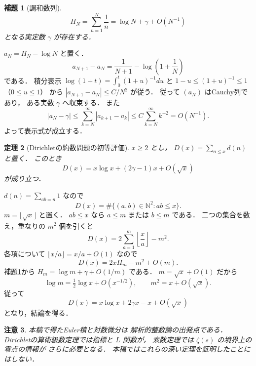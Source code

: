 \documentclass[a5paper,10pt,onecolumn]{jsarticle}
\makeatletter
\theoremstyle{mathnotetheorem}
\newtheorem{theorem}{定理}[section]
\newtheorem{lemma}[theorem]{補題}
\newtheorem{remark}[theorem]{注意}
\renewcommand{\proofname}{証明}
\renewenvironment{proof}[1][\proofname]{%
  \par\pushQED{\qed}\normalfont\topsep4\p@\@plus2\p@\relax
  \trivlist\item[\hskip\labelsep\bfseries #1]\ignorespaces
}{\popQED\endtrivlist\@endpefalse}
\makeatother
\begin{document}
\begin{lemma}[調和数列]\label{lem:harmonic}
\[
 H_N=\sum_{n=1}^N\frac1n
 =\log N+\gamma+O(N^{-1})
\]
となる実定数 $\gamma$ が存在する．
\end{lemma}
\begin{proof}
$a_N=H_N-\log N$ と置く．
\[
 a_{N+1}-a_N
 =\frac1{N+1}-\log\left(1+\frac1N\right)
\]
である．
積分表示
$\log(1+t)=\int_0^t(1+u)^{-1}du$ と
$1-u\le(1+u)^{-1}\le1$（$0\le u\le1$）
から $|a_{N+1}-a_N|\le C/N^2$ が従う．
従って $(a_N)$ はCauchy列であり，
ある実数 $\gamma$ へ収束する．
また
\[
 |a_N-\gamma|
 \le\sum_{k=N}^\infty|a_{k+1}-a_k|
 \le C\sum_{k=N}^\infty k^{-2}=O(N^{-1}).
\]
よって表示式が成立する．
\end{proof}

\begin{theorem}[Dirichletの約数問題の初等評価]
\label{thm:divisor-average}
$x\ge2$ とし，
$D(x)=\sum_{n\le x}d(n)$ と置く．
このとき
\[
 D(x)=x\log x+(2\gamma-1)x+O(\sqrt x)
\]
が成り立つ．
\end{theorem}
\begin{proof}
$d(n)=\sum_{ab=n}1$ なので
\[
 D(x)=\#\{(a,b)\in\mathbb N^2:ab\le x\}.
\]
$m=\lfloor\sqrt x\rfloor$ と置く．
$ab\le x$ なら $a\le m$ または $b\le m$ である．
二つの集合を数え，重なりの $m^2$ 個を引くと
\[
 D(x)=2\sum_{a=1}^m\left\lfloor\frac xa\right\rfloor-m^2.
\]
各項について $\lfloor x/a\rfloor=x/a+O(1)$ なので
\[
 D(x)=2xH_m-m^2+O(m).
\]
補題\ref{lem:harmonic}から
$H_m=\log m+\gamma+O(1/m)$ である．
$m=\sqrt x+O(1)$ だから
\[
 \log m=\tfrac12\log x+O(x^{-1/2}),\qquad
 m^2=x+O(\sqrt x).
\]
従って
\[
 D(x)=x\log x+2\gamma x-x+O(\sqrt x)
\]
となり，結論を得る．
\end{proof}

\begin{remark}
本稿で得たEuler積と対数微分は
解析的整数論の出発点である．
Dirichletの算術級数定理では指標と $L$ 関数が，
素数定理では $\zeta(s)$ の境界上の零点の情報が
さらに必要となる．
本稿ではこれらの深い定理を証明したことにはしない．
\end{remark}
\end{document}
